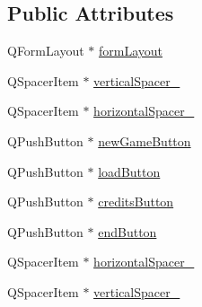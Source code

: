 \subsection*{Public Attributes}
\begin{DoxyCompactItemize}
\item 
Q\-Form\-Layout $\ast$ \hyperlink{classUi__Hauptmenue_a85ff61d607b0597303197bd0d3761046}{form\-Layout}
\item 
Q\-Spacer\-Item $\ast$ \hyperlink{classUi__Hauptmenue_a49a9051523254188bf00ad9086998099}{vertical\-Spacer\-\_}
\item 
Q\-Spacer\-Item $\ast$ \hyperlink{classUi__Hauptmenue_a12dac364a3e6ecd5e8a4c686a2c19ff8}{horizontal\-Spacer\-\_}
\item 
Q\-Push\-Button $\ast$ \hyperlink{classUi__Hauptmenue_a1ba53453bc65f18d70d89ce1bb5e242b}{new\-Game\-Button}
\item 
Q\-Push\-Button $\ast$ \hyperlink{classUi__Hauptmenue_a9f1fdc0227d3ef11b7b7960a97b02f0d}{load\-Button}
\item 
Q\-Push\-Button $\ast$ \hyperlink{classUi__Hauptmenue_a177bc94a75741e57bed020238f6ac3d5}{credits\-Button}
\item 
Q\-Push\-Button $\ast$ \hyperlink{classUi__Hauptmenue_a8708beaede0fa073362609aee0ef02a5}{end\-Button}
\item 
Q\-Spacer\-Item $\ast$ \hyperlink{classUi__Hauptmenue_a5966eee0a1f08411c3437e41000a5a67}{horizontal\-Spacer\-\_}
\item 
Q\-Spacer\-Item $\ast$ \hyperlink{classUi__Hauptmenue_a7ed9d53442254ca6b34ad7e9f9dfe7a3}{vertical\-Spacer\-\_}
\end{DoxyCompactItemize}


